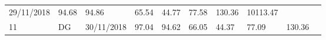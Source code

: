 \documentclass[
  11pt,
]{article}
\begin{document}
\begin{longtable}[]{@{}llllllllll@{}}
\begin{minipage}[t]{0.10\columnwidth}
29/11/2018\strut
\end{minipage} & \begin{minipage}[t]{0.06\columnwidth}\raggedright
94.68\strut
\end{minipage} & \begin{minipage}[t]{0.06\columnwidth}\raggedright
94.86\strut
\end{minipage} & \begin{minipage}[t]{0.06\columnwidth}\raggedright
65.54\strut
\end{minipage} & \begin{minipage}[t]{0.06\columnwidth}\raggedright
44.77\strut
\end{minipage} & \begin{minipage}[t]{0.06\columnwidth}\raggedright
77.58\strut
\end{minipage} & \begin{minipage}[t]{0.13\columnwidth}\raggedright
130.36\strut
\end{minipage} & \begin{minipage}[t]{0.08\columnwidth}\raggedright
10113.47\strut
\end{minipage}\tabularnewline
\begin{minipage}[t]{0.04\columnwidth}\raggedright
11\strut
\end{minipage} & \begin{minipage}[t]{0.09\columnwidth}\raggedright
DG\strut
\end{minipage} & \begin{minipage}[t]{0.10\columnwidth}\raggedright
30/11/2018\strut
\end{minipage} & \begin{minipage}[t]{0.06\columnwidth}\raggedright
97.04\strut
\end{minipage} & \begin{minipage}[t]{0.06\columnwidth}\raggedright
94.62\strut
\end{minipage} & \begin{minipage}[t]{0.06\columnwidth}\raggedright
66.05\strut
\end{minipage} & \begin{minipage}[t]{0.06\columnwidth}\raggedright
44.37\strut
\end{minipage} & \begin{minipage}[t]{0.06\columnwidth}\raggedright
77.09\strut
\end{minipage} & \begin{minipage}[t]{0.13\columnwidth}\raggedright
130.36\strut
\end{minipage} & \begin{minipage}[t]{0.08\columnwidth}\raggedright

\end{minipage}
\end{longtable}
\end{document}
